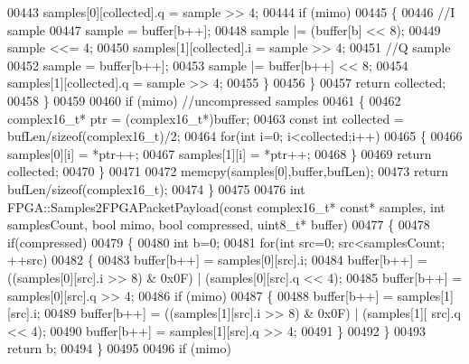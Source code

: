 \begin{DoxyCode}
{{{{{00443             samples[0][collected].q = sample >> 4;
00444             \textcolor{keywordflow}{if} (mimo)
00445             \{
00446                 \textcolor{comment}{//I sample}
00447                 sample = buffer[b++];
00448                 sample |= (buffer[b] << 8);
00449                 sample <<= 4;
00450                 samples[1][collected].i = sample >> 4;
00451                 \textcolor{comment}{//Q sample}
00452                 sample =  buffer[b++];
00453                 sample |= buffer[b++] << 8;
00454                 samples[1][collected].q = sample >> 4;
00455             \}
00456         \}
00457         \textcolor{keywordflow}{return} collected;
00458     \}
00459 
00460     \textcolor{keywordflow}{if} (mimo) \textcolor{comment}{//uncompressed samples}
00461     \{
00462         complex16_t* ptr = (complex16_t*)buffer;
00463         \textcolor{keyword}{const} \textcolor{keywordtype}{int} collected = bufLen/\textcolor{keyword}{sizeof}(complex16_t)/2;
00464         \textcolor{keywordflow}{for}(\textcolor{keywordtype}{int} i=0; i<collected;i++)
00465         \{
00466             samples[0][i] = *ptr++;
00467             samples[1][i] = *ptr++;
00468         \}
00469         \textcolor{keywordflow}{return} collected;
00470     \}
00471 
00472     memcpy(samples[0],buffer,bufLen);
00473     \textcolor{keywordflow}{return} bufLen/\textcolor{keyword}{sizeof}(complex16_t);
00474 \}
00475 
00476 \textcolor{keywordtype}{int} FPGA::Samples2FPGAPacketPayload(\textcolor{keyword}{const} complex16_t* \textcolor{keyword}{const}* samples, \textcolor{keywordtype}{int} samplesCount, \textcolor{keywordtype}{bool} mimo, \textcolor{keywordtype}{bool} 
      compressed, uint8\_t* buffer)
00477 \{
00478     \textcolor{keywordflow}{if}(compressed)
00479     \{
00480         \textcolor{keywordtype}{int} b=0;
00481         \textcolor{keywordflow}{for}(\textcolor{keywordtype}{int} src=0; src<samplesCount; ++src)
00482         \{
00483             buffer[b++] = samples[0][src].i;
00484             buffer[b++] = ((samples[0][src].i >> 8) & 0x0F) | (samples[0][src].q << 4);
00485             buffer[b++] = samples[0][src].q >> 4;
00486             \textcolor{keywordflow}{if} (mimo)
00487             \{
00488                 buffer[b++] = samples[1][src].i;
00489                 buffer[b++] = ((samples[1][src].i >> 8) & 0x0F) | (samples[1][
      src].q << 4);
00490                 buffer[b++] = samples[1][src].q >> 4;
00491             \}
00492         \}
00493         \textcolor{keywordflow}{return} b;
00494     \}
00495 
00496     \textcolor{keywordflow}{if} (mimo)
}}}}}
\end{DoxyCode}
